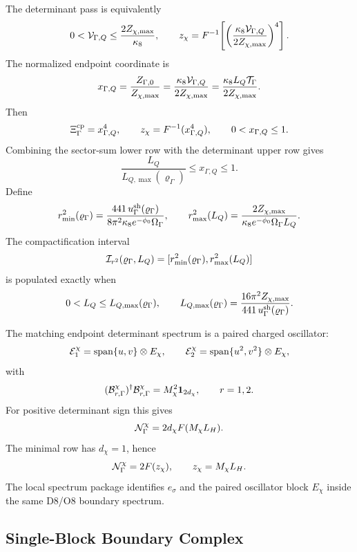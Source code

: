 \documentclass[11pt]{article}
\theoremstyle{definition}
\theoremstyle{remark}
\begin{document}
The determinant pass is equivalently
\[
  0<{\cal V}_{\Gamma,Q}\le
  \frac{2Z_{\chi,\max}}{\kappa_8},
  \qquad
  z_\chi
  =
  F^{-1}\!\left[
  \left(
  \frac{\kappa_8{\cal V}_{\Gamma,Q}}
  {2Z_{\chi,\max}}
  \right)^4
  \right].
\]
The normalized endpoint coordinate is
\[
  x_{\Gamma,Q}
  =
  \frac{Z_{\Gamma,0}}{Z_{\chi,\max}}
  =
  \frac{\kappa_8{\cal V}_{\Gamma,Q}}{2Z_{\chi,\max}}
  =
  \frac{\kappa_8L_Q{\cal T}_\Gamma}{2Z_{\chi,\max}} .
\]
Then
\[
  \Xi_\Gamma^{\rm cp}=x_{\Gamma,Q}^4,
  \qquad
  z_\chi=F^{-1}(x_{\Gamma,Q}^4),
  \qquad
  0<x_{\Gamma,Q}\le1 .
\]
Combining the sector-sum lower row with the determinant upper row gives
\[
  \frac{L_Q}{L_{Q,\max}(\varrho_\Gamma)}
  \le
  x_{\Gamma,Q}
  \le
  1 .
\]
Define
\[
  r_{\min}^2(\varrho_\Gamma)
  =
  \frac{441\,u_\Gamma^{\rm sh}(\varrho_\Gamma)}
  {8\pi^2\kappa_8e^{-\phi_0}\Omega_\Gamma},
  \qquad
  r_{\max}^2(L_Q)
  =
  \frac{2Z_{\chi,\max}}
  {\kappa_8e^{-\phi_0}\Omega_\Gamma L_Q}.
\]
The compactification interval
\[
  {\cal I}_{r^2}(\varrho_\Gamma,L_Q)
  =
  [r_{\min}^2(\varrho_\Gamma),r_{\max}^2(L_Q)]
\]
is populated exactly when
\[
  0<L_Q\le L_{Q,\max}(\varrho_\Gamma),
  \qquad
  L_{Q,\max}(\varrho_\Gamma)
  =
  \frac{16\pi^2Z_{\chi,\max}}
  {441\,u_\Gamma^{\rm sh}(\varrho_\Gamma)} .
\]

The matching endpoint determinant spectrum is a paired charged oscillator:
\[
  {\cal E}_{1}^{\chi}
  =
  {\rm span}\{u,v\}\otimes E_\chi,
  \qquad
  {\cal E}_{2}^{\chi}
  =
  {\rm span}\{u^2,v^2\}\otimes E_\chi,
\]
with
\[
  ({\cal B}_{r,\Gamma}^\chi)^\dagger{\cal B}_{r,\Gamma}^\chi
  =
  M_\chi^2{\bf 1}_{2d_\chi},
  \qquad r=1,2 .
\]
For positive determinant sign this gives
\[
  {\cal N}_\Gamma^\chi=2d_\chi F(M_\chi L_H).
\]
The minimal row has \(d_\chi=1\), hence
\[
  {\cal N}_\Gamma^\chi=2F(z_\chi),
  \qquad z_\chi=M_\chi L_H .
\]
The local spectrum package identifies \(e_\sigma\) and the paired oscillator
block \(E_\chi\) inside the same D8/O8 boundary spectrum.

\subsection{Single-Block Boundary Complex}
\end{document}
